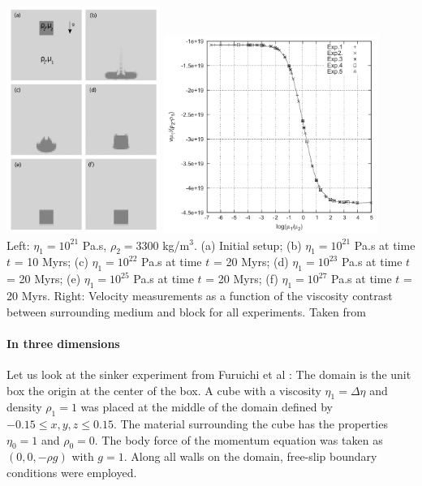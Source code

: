 \begin{center}
\includegraphics[width=5cm]{images/benchmark_sinker/thie11a}
\includegraphics[width=7cm]{images/benchmark_sinker/thie11b}\\
{\captionfont Left: 
$\eta_1 = 10^{21}$ Pa.s, $\rho_2= 3300$ kg/m$^3$. 
(a) Initial setup; 
(b) $\eta_1 = 10^{21}$ Pa.s at time $t$ = 10 Myrs; 
(c) $\eta_1 = 10^{22}$ Pa.s at time $t$ = 20 Myrs; 
(d) $\eta_1 = 10^{23}$ Pa.s at time $t$ = 20 Myrs; 
(e) $\eta_1 = 10^{25}$ Pa.s at time $t$ = 20 Myrs; 
(f) $\eta_1 = 10^{27}$ Pa.s at time $t$ = 20 Myrs. 
Right: Velocity measurements as a function of the viscosity contrast between
surrounding medium and block for all experiments.
Taken from \cite{thie11}}
\end{center}

\paragraph{In three dimensions}
Let us look at the sinker experiment from Furuichi et al \cite{fumt11}: 
The domain is the unit box the origin at the center of the box. A cube with a viscosity $\eta_1=\Delta \eta$ 
and density $\rho_1 = 1$ was placed at the middle of the domain defined by
$-0.15 \leq x,y,z \leq 0.15$.
The material surrounding the cube has the properties $\eta_0=1$ and $\rho_0 = 0$. 
The body force of the momentum equation was taken as $(0, 0,-\rho g)$ with $g = 1$.
Along all walls on the domain, free-slip boundary conditions were employed.


